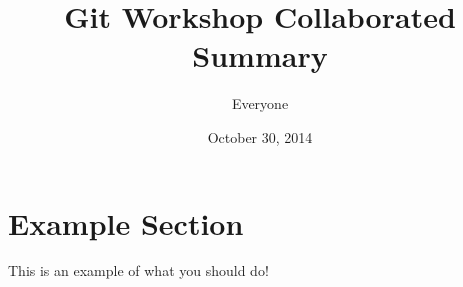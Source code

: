 \documentclass[11pt]{article}
\title{Git Workshop Collaborated Summary}
\author{Everyone}
\date{October 30, 2014}
\begin{document}
\maketitle
\tableofcontents
\pagebreak



\section{Example Section}

This is an example of what you should do!
\end{document}
